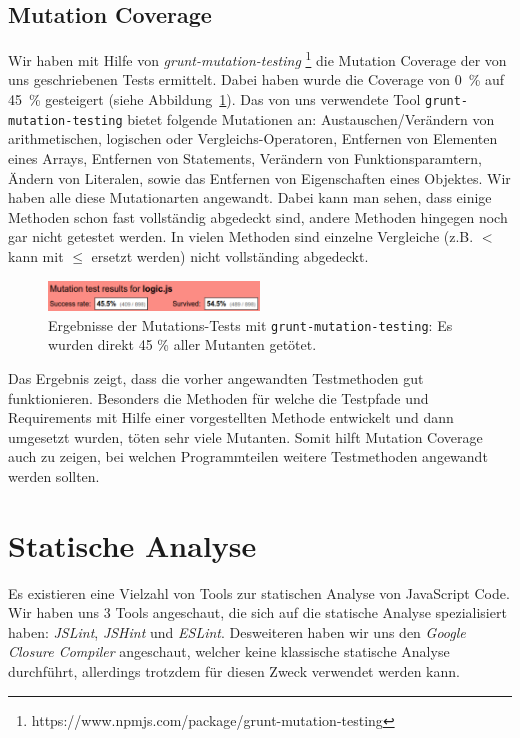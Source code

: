 \documentclass[ngerman]{article}
\begin{document}
\subsection{Mutation Coverage}
Wir haben mit Hilfe von \emph{grunt-mutation-testing} \footnote{https://www.npmjs.com/package/grunt-mutation-testing} die Mutation Coverage der von uns geschriebenen Tests ermittelt.
Dabei haben wurde die Coverage von 0~\% auf 45~\% gesteigert (siehe Abbildung~\ref{fig:mutation}).
Das von uns verwendete Tool \texttt{grunt-mutation-testing} bietet folgende Mutationen an: Austauschen/Ver\-än\-dern von arithmetischen, logischen oder Vergleichs-Operatoren, Entfernen von Elementen eines Arrays, Entfernen von Statements, Verändern von Funktionsparamtern, Ändern von Literalen, sowie das Entfernen von Eigenschaften eines Objektes.
Wir haben alle diese Mutationarten angewandt.
Dabei kann man sehen, dass einige Methoden schon fast vollständig abgedeckt sind, andere Methoden hingegen noch gar nicht getestet werden.
In vielen Methoden sind einzelne Vergleiche (z.B. $<$ kann mit $\leq$ ersetzt werden) nicht vollständing abgedeckt.

\begin{figure}[h!]
\centering
\includegraphics[width=0.5\textwidth]{figures/mutation_tests.pdf}
\caption{Ergebnisse der Mutations-Tests mit \texttt{grunt-mutation-testing}: Es wurden direkt 45 \% aller Mutanten getötet.}
\label{fig:mutation}
\end{figure}

Das Ergebnis zeigt, dass die vorher angewandten Testmethoden gut funktionieren. Besonders die Methoden für welche die Testpfade und Requirements mit Hilfe einer vorgestellten Methode entwickelt und dann umgesetzt wurden, töten sehr viele Mutanten. Somit hilft Mutation Coverage auch zu zeigen, bei welchen Programmteilen weitere Testmethoden angewandt werden sollten.


\section{Statische Analyse}

Es existieren eine Vielzahl von Tools zur statischen Analyse von JavaScript Code.
Wir haben uns 3 Tools angeschaut, die sich auf die statische Analyse spezialisiert haben: \emph{JSLint}, \emph{JSHint} und \emph{ESLint}.
Desweiteren haben wir uns den \emph{Google Closure Compiler} angeschaut, welcher keine klassische statische Analyse durchführt, allerdings trotzdem für diesen Zweck verwendet werden kann.
\end{document}
